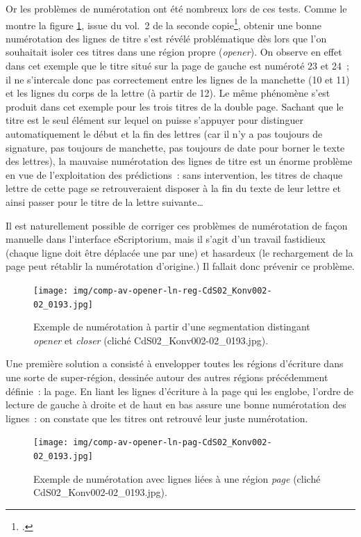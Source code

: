 \documentclass[a4paper,12pt,twoside]{book}
\begin{document}
				Or les problèmes de numérotation ont été nombreux lors de ces tests. Comme le montre la figure \ref{comp-av-opener-ln-reg-193}, issue du vol.~2 de la seconde copie\footcite{CdS02001369}, obtenir une bonne numérotation des lignes de titre s'est révélé problématique dès lors que l'on souhaitait isoler ces titres dans une région propre (\textit{opener}). On observe en effet dans cet exemple que le titre situé sur la page de gauche est numéroté 23 et 24~; il ne s'intercale donc pas correctement entre les lignes de la manchette (10 et 11) et les lignes du corps de la lettre (à partir de 12). Le même phénomène s'est produit dans cet exemple pour les trois titres de la double page. Sachant que le titre est le seul élément sur lequel on puisse s'appuyer pour distinguer automatiquement le début et la fin des lettres (car il n'y a pas toujours de signature, pas toujours de manchette, pas toujours de date pour borner le texte des lettres), la mauvaise numérotation des lignes de titre est un énorme problème en vue de l'exploitation des \glspl{prédiction}~: sans intervention, les titres de chaque lettre de cette page se retrouveraient disposer à la fin du texte de leur lettre et ainsi passer pour le titre de la lettre suivante…
				
				Il est naturellement possible de corriger ces problèmes de numérotation de façon manuelle dans l'interface eScriptorium, mais il s'agit d'un travail fastidieux (chaque ligne doit être déplacée une par une) et hasardeux (le rechargement de la page peut rétablir la  numérotation d'origine.) Il fallait donc prévenir ce problème.
				
				\begin{figure}[!h]
					\centering
					\texttt{[image: img/comp-av-opener-ln-reg-CdS02\_Konv002-02\_0193.jpg]}
					\caption{Exemple de numérotation à partir d'une {segmentation} distingant \textit{opener} et \textit{closer} (cliché CdS02\_Konv002-02\_0193.jpg).}
					\label{comp-av-opener-ln-reg-193}
				\end{figure}
			
				Une première solution a consisté à envelopper toutes les régions d'écriture dans une sorte de super-région, dessinée autour des autres régions précédemment définie~: la page. En liant les lignes d'écriture à la page qui les englobe, l'ordre de lecture de gauche à droite et de haut en bas assure une bonne numérotation des lignes~: on constate que les titres ont retrouvé leur juste numérotation.
				
				\begin{figure}[!h]
					\centering
					\texttt{[image: img/comp-av-opener-ln-pag-CdS02\_Konv002-02\_0193.jpg]}
					\caption{Exemple de numérotation avec lignes liées à une région \textit{page} (cliché CdS02\_Konv002-02\_0193.jpg).}
					\label{annotation-page-66}
				\end{figure}
				
\end{document}
